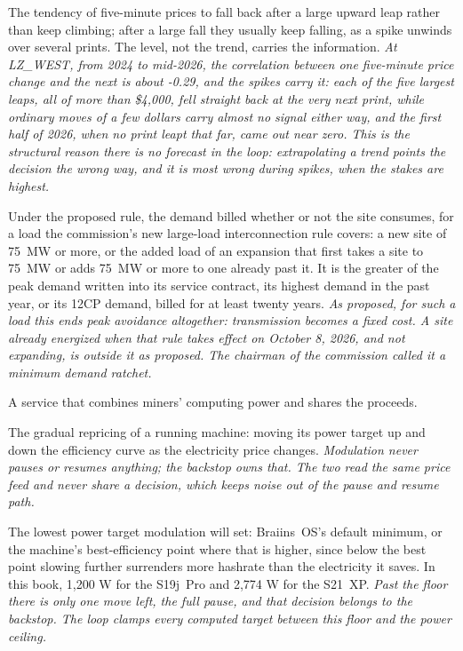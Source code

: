 \begin{description}[leftmargin=0pt,style=unboxed,itemsep=0.35em,parsep=0.15em]
\item[mean reversion] \hypertarget{glossary:mean-reversion}{}The tendency of five-minute prices to fall back after a large upward leap rather than keep climbing; after a large fall they usually keep falling, as a spike unwinds over several prints. The level, not the trend, carries the information. \emph{At LZ\_WEST, from 2024 to mid-2026, the correlation between one five-minute price change and the next is about -0.29, and the spikes carry it: each of the five largest leaps, all of more than \$4,000, fell straight back at the very next print, while ordinary moves of a few dollars carry almost no signal either way, and the first half of 2026, when no print leapt that far, came out near zero. This is the structural reason there is no forecast in the loop: extrapolating a trend points the decision the wrong way, and it is most wrong during spikes, when the stakes are highest.}
\item[minimum billing demand] \hypertarget{glossary:minimum-billing-demand}{}Under the proposed rule, the demand billed whether or not the site consumes, for a load the commission's new large-load interconnection rule covers: a new site of 75~MW or more, or the added load of an expansion that first takes a site to 75~MW or adds 75~MW or more to one already past it. It is the greater of the peak demand written into its service contract, its highest demand in the past year, or its 12CP demand, billed for at least twenty years. \emph{As proposed, for such a load this ends peak avoidance altogether: transmission becomes a fixed cost. A site already energized when that rule takes effect on October 8, 2026, and not expanding, is outside it as proposed. The chairman of the commission called it a minimum demand ratchet.}
\item[mining pool] \hypertarget{glossary:mining-pool}{}A service that combines miners' computing power and shares the proceeds.
\item[modulation] \hypertarget{glossary:modulation}{}The gradual repricing of a running machine: moving its power target up and down the efficiency curve as the electricity price changes. \emph{Modulation never pauses or resumes anything; the backstop owns that. The two read the same price feed and never share a decision, which keeps noise out of the pause and resume path.}
\item[modulation floor] \hypertarget{glossary:modulation-floor}{}The lowest power target modulation will set: Braiins~OS's default minimum, or the machine's best-efficiency point where that is higher, since below the best point slowing further surrenders more hashrate than the electricity it saves. In this book, 1,200 W for the S19j~Pro and 2,774 W for the S21~XP. \emph{Past the floor there is only one move left, the full pause, and that decision belongs to the backstop. The loop clamps every computed target between this floor and the power ceiling.}

\end{description}
